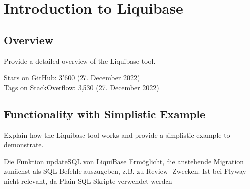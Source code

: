 

\chapter{Introduction to Liquibase}
\section{Overview}
Provide a detailed overview of the Liquibase tool.

%
Stars on GitHub: 3'600 (27. December 2022)\\
Tags on StackOverflow: 3,530 (27. December 2022)\\

\section{Functionality with Simplistic Example}
Explain how the Liquibase tool works and provide a simplistic example to demonstrate.




Die Funktion updateSQL von LiquiBase
Ermöglicht, die anstehende Migration zunächst als SQL-Befehle auszugeben, z.B. zu Review- Zwecken.
Ist bei Flyway nicht relevant, da Plain-SQL-Skripte verwendet werden


\newpage